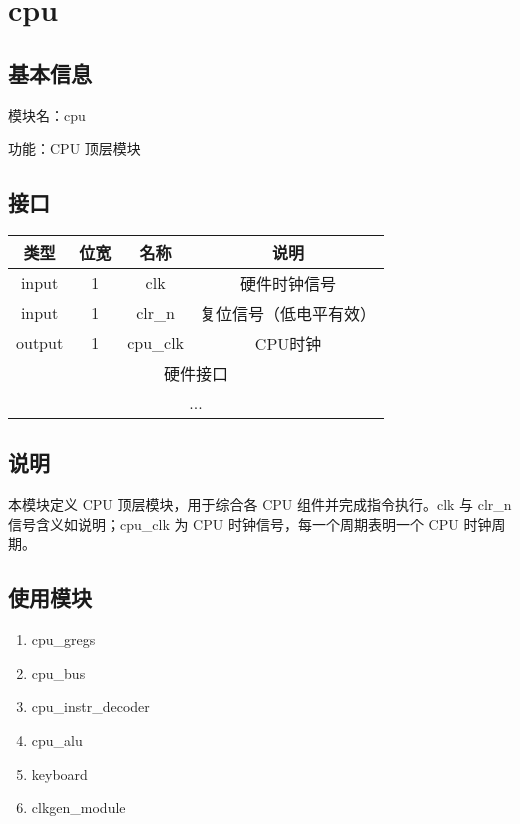 \section{cpu}
\subsection{基本信息}
模块名：cpu

功能：CPU 顶层模块
\subsection{接口}
\begin{tabular}{|c|c|c|c|}
    \hline
    类型    & 位宽 &   名称    &   说明\\\hline
    input   &  1  &   clk     &   硬件时钟信号\\\hline
    input   &  1  &   clr\_n   &   复位信号（低电平有效）\\\hline
    output  &  1  &   cpu\_clk &   CPU时钟\\\hline
    \multicolumn{4}{|c|}{硬件接口}\\\hline
    \multicolumn{4}{|c|}{...}\\\hline
\end{tabular}

\subsection{说明}
本模块定义 CPU 顶层模块，用于综合各 CPU 组件并完成指令执行。clk 与 clr\_n 信号含义如说明；cpu\_clk 为 CPU 时钟信号，每一个周期表明一个 CPU 时钟周期。

\subsection{使用模块}
\begin{enumerate}
    \item cpu\_gregs
    \item cpu\_bus
    \item cpu\_instr\_decoder
    \item cpu\_alu
    \item keyboard
    \item clkgen\_module
\end{enumerate}

